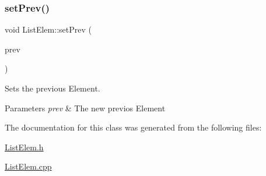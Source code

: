 \subsubsection{\texorpdfstring{set\+Prev()}{setPrev()}}
{\footnotesize\ttfamily void List\+Elem\+::set\+Prev (\begin{DoxyParamCaption}\item[{\hyperlink{class_list_elem}{List\+Elem} $\ast$const}]{prev }\end{DoxyParamCaption})}



Sets the previous Element. 


\begin{DoxyParams}{Parameters}
{\em prev} & The new previos Element \\
\hline
\end{DoxyParams}


The documentation for this class was generated from the following files\+:\begin{DoxyCompactItemize}
\item 
\hyperlink{_list_elem_8h}{List\+Elem.\+h}\item 
\hyperlink{_list_elem_8cpp}{List\+Elem.\+cpp}\end{DoxyCompactItemize}
